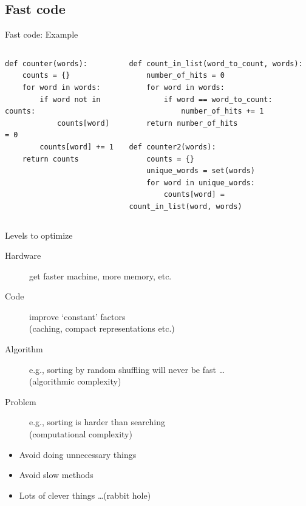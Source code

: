 \documentclass[aspectratio=169,usenames,dvipsnames]{beamer}
\begin{document}
\subsection{Fast code}
\begin{frame}[fragile]{Fast code: Example}
    \begin{columns}[T]
\begin{lstlisting}[style=smaller]
def counter(words):
    counts = {}
    for word in words:
        if word not in counts:
            counts[word] = 0
        counts[word] += 1
    return counts
\end{lstlisting}
\begin{lstlisting}[style=smaller]
def count_in_list(word_to_count, words):
    number_of_hits = 0
    for word in words:
        if word == word_to_count:
            number_of_hits += 1
    return number_of_hits

def counter2(words):
    counts = {}
    unique_words = set(words)
    for word in unique_words:
        counts[word] = count_in_list(word, words)
\end{lstlisting}
\end{columns}
\end{frame}


\begin{frame}{Levels to optimize}
    \begin{description}
        \item[Hardware] get faster machine, more memory, etc.
        \item[Code] improve `constant' factors \\
			(caching, compact representations etc.)
        \item[Algorithm] e.g., sorting by random shuffling will never be fast \dots \\
			(algorithmic complexity)
        \item[Problem] e.g., sorting is harder than searching \\
			(computational complexity)
    \end{description}

    \pause
    \begin{itemize}
        \item Avoid doing unnecessary things
        \item Avoid slow methods
        \item Lots of clever things \dots (rabbit hole)
    \end{itemize}
\end{frame}
\end{document}
